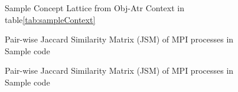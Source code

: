 


\begin{figure}[t]
\centering
{}
\caption{Sample Concept Lattice from Obj-Atr Context in table\ref{tab:sampleContext}}
\label{fig:sampleCL}
\end{figure}


\begin{figure}[]
\centering
{}
\caption{Pair-wise Jaccard Similarity Matrix (JSM) of MPI processes in Sample code}
\label{fig:jsm}
\end{figure}

\begin{figure}[]
\centering
{}
\caption{Pair-wise Jaccard Similarity Matrix (JSM) of MPI processes in Sample code}
\label{fig:jsm}
\end{figure}

